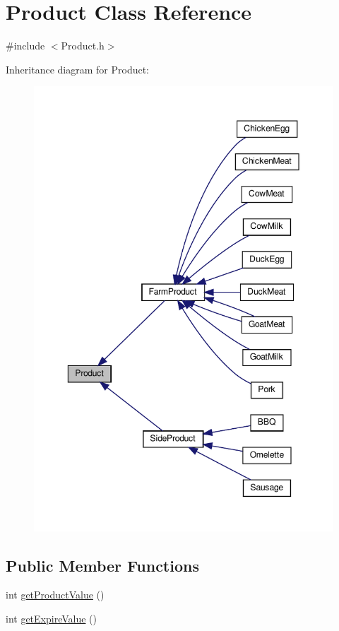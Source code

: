 \hypertarget{classProduct}{}\section{Product Class Reference}
\label{classProduct}


{\ttfamily \#include $<$Product.\+h$>$}



Inheritance diagram for Product\+:
\nopagebreak
\begin{figure}[H]
\begin{center}
\leavevmode
\includegraphics[width=349pt]{classProduct__inherit__graph}
\end{center}
\end{figure}
\subsection*{Public Member Functions}
\begin{DoxyCompactItemize}
\item 
int \hyperlink{classProduct_a3d0f4dafb8cfe6a3d90fd661dc6cb2d0}{get\+Product\+Value} ()
\item 
int \hyperlink{classProduct_af1bdfcee872537bb8492160109aa7fb3}{get\+Expire\+Value} ()
\end{DoxyCompactItemize}
